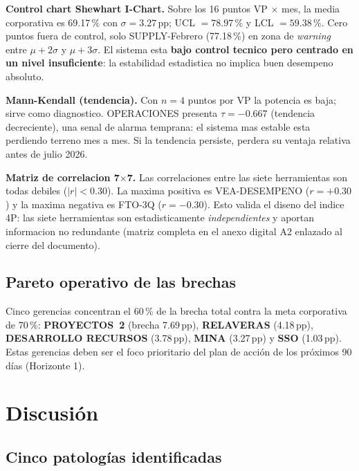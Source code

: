 \documentclass[12pt,a4paper]{article}
\begin{document}
\textbf{Control chart Shewhart I-Chart.} Sobre los 16 puntos VP $\times$ mes, la media corporativa es 69.17\,\% con $\sigma = 3.27$\,pp; UCL $= 78.97\,\%$ y LCL $= 59.38\,\%$. Cero puntos fuera de control, solo SUPPLY-Febrero (77.18\,\%) en zona de \emph{warning} entre $\mu+2\sigma$ y $\mu+3\sigma$. El sistema esta \textbf{bajo control tecnico pero centrado en un nivel insuficiente}: la estabilidad estadistica no implica buen desempeno absoluto.

\textbf{Mann-Kendall (tendencia).} Con $n=4$ puntos por VP la potencia es baja; sirve como diagnostico. OPERACIONES presenta $\tau = -0.667$ (tendencia decreciente), una senal de alarma temprana: el sistema mas estable esta perdiendo terreno mes a mes. Si la tendencia persiste, perdera su ventaja relativa antes de julio 2026.

\textbf{Matriz de correlacion 7$\times$7.} Las correlaciones entre las siete herramientas son todas debiles ($|r|<0.30$). La maxima positiva es VEA-DESEMPENO ($r=+0.30$) y la maxima negativa es FTO-3Q ($r=-0.30$). Esto valida el diseno del indice 4P: las siete herramientas son estadisticamente \emph{independientes} y aportan informacion no redundante (matriz completa en el anexo digital A2 enlazado al cierre del documento).

\subsection{Pareto operativo de las brechas}

Cinco gerencias concentran el 60\,\% de la brecha total contra la meta corporativa de 70\,\%: \textbf{PROYECTOS~2} (brecha 7.69\,pp), \textbf{RELAVERAS} (4.18\,pp), \textbf{DESARROLLO RECURSOS} (3.78\,pp), \textbf{MINA} (3.27\,pp) y \textbf{SSO} (1.03\,pp). Estas gerencias deben ser el foco prioritario del plan de acción de los próximos 90 días (Horizonte 1).

\section{Discusión}

\subsection{Cinco patologías identificadas}
\end{document}

